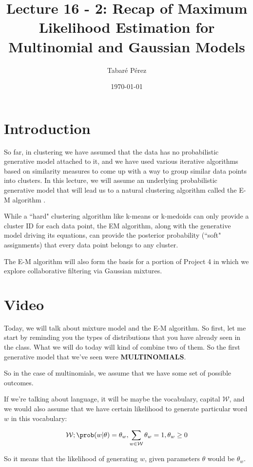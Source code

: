 \documentclass[a4paper, 12pt]{article}
\author{Tabaré Pérez}
\date{\today}
\title{Lecture 16 - 2: Recap of Maximum Likelihood Estimation for Multinomial and Gaussian Models}
\begin{document}
\maketitle
\section*{Introduction}
\label{sec:org024e83c}

So far, in clustering we have assumed that the data has no probabilistic
generative model attached to it, and we have used various iterative algorithms
based on similarity measures to come up with a way to group similar data points
into clusters. In this lecture, we will assume an underlying probabilistic
generative model that will lead us to a natural clustering algorithm called the
E-M algorithm .

While a “hard" clustering algorithm like k-means or k-medoids can only provide a
cluster ID for each data point, the EM algorithm, along with the generative
model driving its equations, can provide the posterior probability (“soft"
assignments) that every data point belongs to any cluster.

The E-M algorithm will also form the basis for a portion of Project 4 in which we
explore collaborative filtering via Gaussian mixtures.

\section*{Video}
\label{sec:orge3d2a4d}

Today, we will talk about mixture model and the E-M algorithm. So first, let me
start by reminding you the types of distributions that you have already seen in
the class. What we will do today will kind of combine two of them. So the first
generative model that we've seen were \textbf{MULTINOMIALS}.

So in the case of multinomials, we assume that we have some set of possible
outcomes.

If we're talking about language, it will be maybe the vocabulary, capital
\(\mathcal{W}\), and we would also assume that we have certain likelihood to
generate particular word \(w\) in this vocabulary:

\begin{equation}
\label{eq:orgd717e3e}
\mathcal{W}; \prob(w|\theta) = \theta_w, \sum_{w \in \mathcal{W}} \theta_w = 1, \theta_w \geq 0
\end{equation}

So it means that the likelihood of generating \(w\), given
parameters \(\theta\) would be \(\theta_w\).
\end{document}
